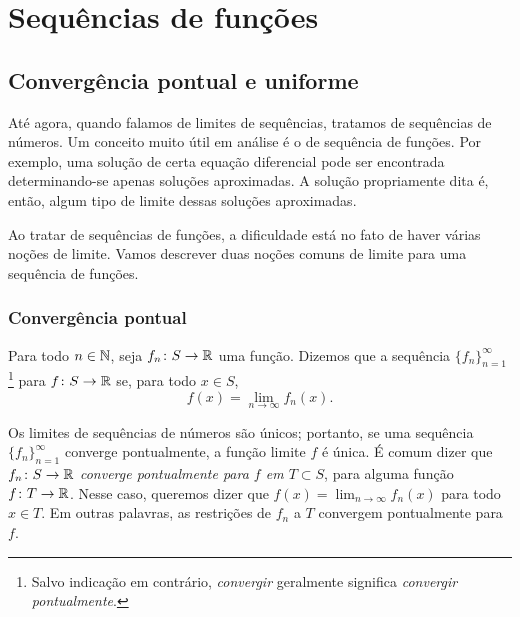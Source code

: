 \chapter{Sequências de funções} \label{fs:chapter}


\section{Convergência pontual e uniforme}
\label{sec:puconv}



Até agora, quando falamos de limites de sequências, tratamos de sequências
de números. Um conceito muito útil em análise é o de sequência de funções.
Por exemplo, uma solução de certa equação diferencial pode ser encontrada
determinando-se apenas soluções aproximadas. A solução propriamente dita é,
então, algum tipo de limite dessas soluções aproximadas.

Ao tratar de sequências de funções, a dificuldade está no fato de haver
várias noções de limite. Vamos descrever duas noções comuns de limite para
uma sequência de funções.

\subsection{Convergência pontual}

\begin{defn}
Para todo $n\in{\mathbb{N}}$, seja $f_n \colon S \to {\mathbb{R}}$ uma função. Dizemos que a sequência
$\{ f_n \}_{n=1}^\infty$
\emph{}\footnote{Salvo indicação em
contrário, \emph{convergir} geralmente significa \emph{convergir
pontualmente}.} para $f \colon S \to {\mathbb{R}}$ se, para
todo $x\in S$,
\begin{equation*}
f(x) =
\lim_{n\to\infty} f_n(x) .
\end{equation*}
\end{defn}

Os limites de sequências de números são únicos; portanto, se uma sequência
$\{f_n\}_{n=1}^\infty$ converge pontualmente, a função limite $f$ é única.
É comum dizer que $f_n \colon S \to {\mathbb{R}}$ \emph{converge pontualmente para
$f$ em $T\subset S$}, para alguma função $f \colon T \to {\mathbb{R}}$. Nesse caso,
queremos dizer que $f(x)=\lim_{n\to\infty}f_n(x)$ para todo $x\in T$. Em
outras palavras, as restrições de $f_n$ a $T$ convergem pontualmente para $f$.


